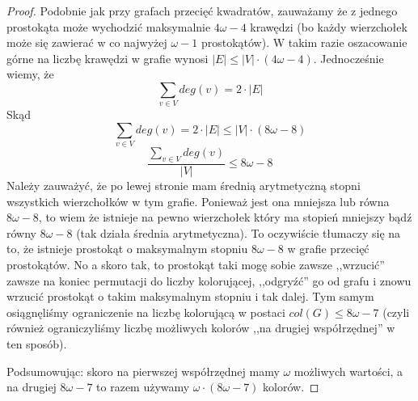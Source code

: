 \begin{proof}
	Podobnie jak przy grafach przecięć kwadratów, zauważamy że z jednego prostokąta może wychodzić maksymalnie $4\omega - 4$ krawędzi (bo każdy wierzchołek może się zawierać w co najwyżej $\omega - 1$ prostokątów).
	W takim razie oszacowanie górne na liczbę krawędzi w grafie wynosi $|E| \leq |V| \cdot (4\omega - 4)$. Jednocześnie wiemy, że \begin{equation*}
		\sum_{v \in V} deg(v) = 2 \cdot |E|
	\end{equation*}
	Skąd
	\begin{equation*}
		\sum_{v \in V} deg(v) = 2 \cdot |E| \leq |V| \cdot (8 \omega - 8)
	\end{equation*}
	\begin{equation*}
		\frac{\sum_{v \in V} deg(v)}{|V|} \leq 8 \omega - 8
	\end{equation*}
	Należy zauważyć, że po lewej stronie mam średnią arytmetyczną stopni wszystkich wierzchołków w tym grafie. Ponieważ jest ona mniejsza lub równa $8 \omega - 8$, to wiem że istnieje na pewno wierzchołek który ma stopień mniejszy bądź równy $8\omega - 8$ (tak działa średnia arytmetyczna). To oczywiście tłumaczy się na to, że istnieje prostokąt o maksymalnym stopniu $8\omega - 8$ w grafie przecięć prostokątów. No a skoro tak, to prostokąt taki mogę sobie zawsze ,,wrzucić'' zawsze na koniec permutacji do liczby kolorującej, ,,odgryźć'' go od grafu i znowu wrzucić prostokąt o takim maksymalnym stopniu i tak dalej. Tym samym osiągnęliśmy ograniczenie na liczbę kolorującą w postaci $col(G) \leq 8\omega - 7$ (czyli również ograniczyliśmy liczbę możliwych kolorów ,,na drugiej współrzędnej'' w ten sposób).

	Podsumowując: skoro na pierwszej współrzędnej mamy $\omega$ możliwych wartości, a na drugiej $8\omega - 7$ to razem używamy $\omega \cdot (8\omega - 7)$ kolorów.

\end{proof}